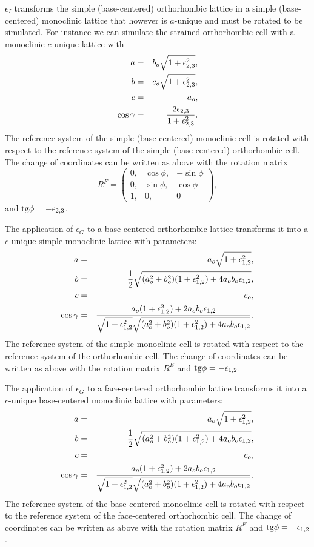 \documentclass[12pt,a4paper]{article}
\begin{document}
$\epsilon_I$ transforms the simple (base-centered) orthorhombic lattice 
in a simple (base-centered) monoclinic lattice that 
however is $a$-unique and must be rotated to be simulated.
For instance we can simulate the strained orthorhombic cell with a monoclinic
$c$-unique lattice with
\begin{eqnarray}
a&=&b_o \sqrt{1+\epsilon_{2,3}^2}, \\
b&=&c_o \sqrt{1+\epsilon_{2,3}^2}, \\
c&=&a_o, \\
\cos\gamma &=& {2 \epsilon_{2,3} \over 1 + \epsilon_{2,3}^2}. 
\end{eqnarray}
The reference system of the simple (base-centered) monoclinic cell is 
rotated with respect to
the reference system of the simple (base-centered) orthorhombic cell. 
The change of coordinates can be written as above with the rotation matrix 
\begin{equation}
R^F=\left( \begin{array}{ccc}
0, & \cos \phi, &  -\sin \phi
\\
0, & \sin \phi, & \cos \phi 
\\
1, & 0, & 0
\end{array}
\right),
\end{equation}
and ${\rm tg} \phi =-\epsilon_{2,3}$. 

The application of $\epsilon_G$ to a base-centered orthorhombic lattice
transforms it into a $c$-unique simple monoclinic lattice with parameters:
\begin{eqnarray}
a&=&a_o \sqrt{1+\epsilon_{1,2}^2}, \\
b&=&{1\over 2} \sqrt{(a_o^2+b_o^2)(1+\epsilon_{1,2}^2)+4a_ob_o\epsilon_{1,2}}, \\
c&=&c_o,  \\
\cos\gamma &=& {a_o (1+\epsilon_{1,2}^2)+2a_ob_o\epsilon_{1,2} \over
\sqrt{1+\epsilon_{1,2}^2} \sqrt{(a_o^2+b_o^2)
(1+\epsilon_{1,2}^2)+4a_ob_o\epsilon_{1,2}}}. 
\end{eqnarray}
The reference system of the simple monoclinic cell is rotated with respect to
the reference system of the orthorhombic cell. 
The change of coordinates can be written as above with the rotation matrix 
$R^E$ and ${\rm tg}\phi=-\epsilon_{1,2}$.

The application of $\epsilon_G$ to a face-centered orthorhombic lattice
transforms it into a $c$-unique base-centered monoclinic lattice with 
parameters:
\begin{eqnarray}
a&=&a_o \sqrt{1+\epsilon_{1,2}^2}, \\
b&=&{1\over 2} \sqrt{(a_o^2+b_o^2)(1+\epsilon_{1,2}^2)+4a_ob_o\epsilon_{1,2}}, \\
c&=&c_o,  \\
\cos\gamma &=& {a_o (1+\epsilon_{1,2}^2)+2a_ob_o\epsilon_{1,2} \over
\sqrt{1+\epsilon_{1,2}^2} \sqrt{(a_o^2+b_o^2)
(1+\epsilon_{1,2}^2)+4a_ob_o\epsilon_{1,2}}}. 
\end{eqnarray}
The reference system of the base-centered monoclinic cell is rotated 
with respect to the reference system of the face-centered orthorhombic cell. 
The change of coordinates can be written as above with the rotation matrix 
$R^E$ and ${\rm tg}\phi=-\epsilon_{1,2}$.
\end{document}
